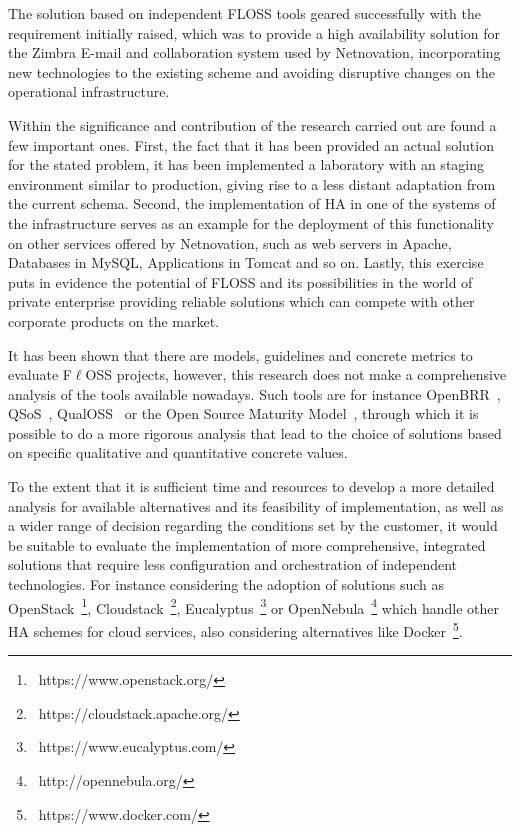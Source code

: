\documentclass[a4paper, 12pt]{book}
\begin{document}
\noindent The solution based on independent FLOSS tools geared successfully with the requirement initially raised, which was to provide a high availability solution for the Zimbra E-mail and collaboration system used by Netnovation, incorporating new technologies to the existing scheme and avoiding disruptive changes on the operational infrastructure.\bigskip

\noindent Within the significance and contribution of the research carried out are found a few important ones. First, the fact that it has been provided an actual solution for the stated problem, it has been implemented a laboratory with an staging environment similar to production, giving rise to a less distant adaptation from the current schema. Second, the implementation of HA in one of the systems of the infrastructure serves as an example for the deployment of this functionality on other services offered by Netnovation, such as web servers in Apache, Databases in MySQL, Applications in Tomcat and so on. Lastly, this exercise puts in evidence the potential of FLOSS and its possibilities in the world of private enterprise providing reliable solutions which can compete with other corporate products on the market.\bigskip

\noindent It has been shown that there are models, guidelines and concrete metrics to evaluate F$\ell$OSS projects, however, this research does not make a comprehensive analysis of the tools available nowadays. Such tools are for instance OpenBRR~\cite{Wasserman}, QSoS~\cite{QSOS}, QualOSS~\cite{QOSS} or the Open Source Maturity Model~\cite{OSMM}, through which it is possible to do a more rigorous analysis that lead to the choice of solutions based on specific qualitative and quantitative concrete values.\bigskip

\noindent To the extent that it is sufficient time and resources to develop a more detailed analysis for available alternatives and its feasibility of implementation, as well as a wider range of decision regarding the conditions set by the customer, it would be suitable to evaluate the implementation of more comprehensive, integrated solutions that require less configuration and orchestration of independent technologies. For instance considering the adoption of solutions such as OpenStack~\footnote{{\tiny\ https://www.openstack.org/}}, Cloudstack~\footnote{{\tiny\ https://cloudstack.apache.org/}}, Eucalyptus~\footnote{{\tiny\ https://www.eucalyptus.com/}} or OpenNebula~\footnote{{\tiny\ http://opennebula.org/}} which handle other HA schemes for cloud services, also considering alternatives like Docker~\footnote{\tiny\ https://www.docker.com/}.
\end{document}
